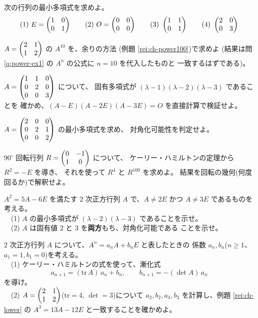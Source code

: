 \begin{mondai}[基本]\label{q:ch-ex4}
次の行列の最小多項式を求めよ。
\[
(1)\ E = \begin{pmatrix}1 & 0 \\ 0 & 1\end{pmatrix} \qquad
(2)\ O = \begin{pmatrix}0 & 0 \\ 0 & 0\end{pmatrix} \qquad
(3)\ \begin{pmatrix}1 & 1 \\ 0 & 1\end{pmatrix} \qquad
(4)\ \begin{pmatrix}2 & 0 \\ 0 & 3\end{pmatrix}
\]
\end{mondai}

\begin{mondai}[標準]\label{q:ch-ex5}
$A = \begin{pmatrix}2 & 1 \\ 1 & 2\end{pmatrix}$ の $A^{10}$ を、余りの方法
(例題 \ref{rei:ch-power100})で求めよ
(結果は問 \ref{q:power-ex1} の $A^n$ の公式に $n = 10$ を代入したものと
一致するはずである)。
\end{mondai}

\begin{mondai}[標準]\label{q:ch-ex6}
$A = \begin{pmatrix}1 & 1 & 0 \\ 0 & 2 & 0 \\ 0 & 0 & 3\end{pmatrix}$ について、
固有多項式が $(\lambda - 1)(\lambda - 2)(\lambda - 3)$ であることを
確かめ、$(A - E)(A - 2E)(A - 3E) = O$ を直接計算で検証せよ。
\end{mondai}

\begin{mondai}[標準]\label{q:ch-ex7}
$A = \begin{pmatrix}2 & 0 & 0 \\ 0 & 2 & 1 \\ 0 & 0 & 2\end{pmatrix}$ の最小多項式を求め、
対角化可能性を判定せよ。
\end{mondai}

\begin{mondai}[標準]\label{q:ch-ex8}
$90^\circ$ 回転行列 $R = \begin{pmatrix}0 & -1 \\ 1 & 0\end{pmatrix}$ について、
ケーリー・ハミルトンの定理から $R^2 = -E$ を導き、
それを使って $R^4$ と $R^{100}$ を求めよ。
結果を回転の幾何(何度回るか)で解釈せよ。
\end{mondai}

\begin{mondai}[発展]\label{q:ch-ex9}
$A^2 = 5A - 6E$ を満たす $2$ 次正方行列 $A$ で、$A \neq 2E$ かつ
$A \neq 3E$ であるものを考える。\\
　(1) $A$ の最小多項式が $(\lambda - 2)(\lambda - 3)$ であることを示せ。\\
　(2) $A$ は固有値 $2$ と $3$ を\textbf{両方}もち、対角化可能である
ことを示せ。
\end{mondai}

\begin{mondai}[発展]\label{q:ch-ex10}
$2$ 次正方行列 $A$ について、$A^n = a_n A + b_n E$ と表したときの
係数 $a_n, b_n$($n \ge 1$、$a_1 = 1, b_1 = 0$)を考える。\\
　(1) ケーリー・ハミルトンの式を使って、漸化式
\[
a_{n+1} = (\mathrm{tr}\,A)\,a_n + b_n, \qquad
b_{n+1} = -(\det A)\,a_n
\]
を導け。\\
　(2) $A = \begin{pmatrix}2 & 1 \\ 1 & 2\end{pmatrix}$($\mathrm{tr} = 4$, $\det = 3$)について
$a_2, b_2, a_3, b_3$ を計算し、例題 \ref{rei:ch-lower} の
$A^3 = 13A - 12E$ と一致することを確かめよ。
\end{mondai}

